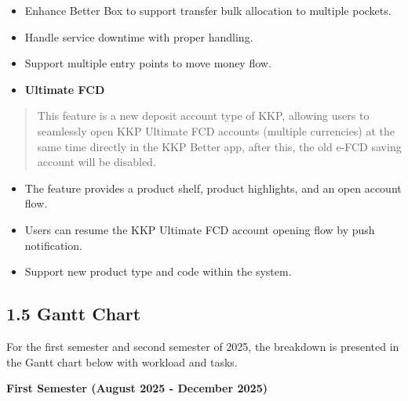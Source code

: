 \begin{itemize}
\item
  Enhance Better Box to support transfer bulk allocation to multiple
  pockets.
\item
  Handle service downtime with proper handling.
\item
  Support multiple entry points to move money flow.
\end{itemize}

\begin{itemize}
\item
  \textbf{Ultimate FCD}
\end{itemize}

\begin{quote}
This feature is a new deposit account type of KKP, allowing users to
seamlessly open KKP Ultimate FCD accounts (multiple currencies) at the
same time directly in the KKP Better app, after this, the old e-FCD
saving account will be disabled.
\end{quote}

\begin{itemize}
\item
  The feature provides a product shelf, product highlights, and an open
  account flow.
\item
  Users can resume the KKP Ultimate FCD account opening flow by push
  notification.
\item
  Support new product type and code within the system.
\end{itemize}

\subsection{\texorpdfstring{\textbf{1.5 Gantt
Chart}}{1.5 Gantt Chart}}\label{gantt-chart}

For the first semester and second semester of 2025, the breakdown is
presented in the Gantt chart below with workload and tasks.

\textbf{First Semester (August 2025 - December 2025)}

